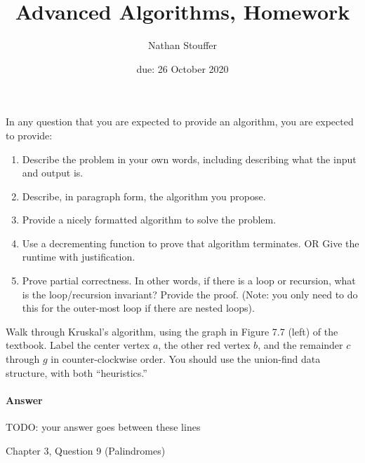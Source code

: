 \documentclass{article}
\title{Advanced Algorithms, Homework \hwnum}
\author{Nathan Stouffer}
\date{due: 26 October 2020}
\begin{document}
\maketitle

In any question that you are expected to provide an algorithm, you are
expected to provide:
\begin{enumerate}
    \item Describe the problem in your own words, including
        describing what the input and output is.
    \item Describe, in paragraph form, the algorithm you propose.
    \item Provide a nicely formatted algorithm to solve the problem.
    \item Use a decrementing function to prove that algorithm terminates.
            OR  Give the runtime with justification.
    \item Prove partial correctness.  In other words, if there is a loop or
        recursion, what is the loop/recursion invariant? Provide the proof.
        (Note: you only need to do this for the outer-most loop if there are
        nested loops).
\end{enumerate}



\nextprob
{}

Walk through Kruskal's algorithm, using the graph in Figure 7.7 (left) of the
textbook.  Label the center vertex $a$, the other red vertex $b$, and the
remainder $c$ through $g$ in counter-clockwise order.  You should use the
union-find data structure, with both ``heuristics.''

\paragraph{Answer}


TODO: your answer goes between these lines


\nextprob
{}

Chapter 3, Question 9 (Palindromes)
\end{document}
